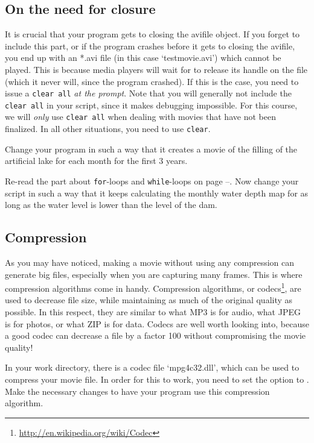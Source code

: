 \subsection{On the need for closure}
It is crucial that your program gets to closing the avifile object. If you forget to include this part, or if the program crashes before it gets to closing the avifile, you end up with an *.avi file (in this case `testmovie.avi') which cannot be played. This is because media players will wait for \MATLAB{} to release its handle on the file (which it never will, since the program crashed). If this is the case, you need to issue a {\tt clear all} \textit{at the prompt}. Note that you will generally not include the {\tt clear all} in your script, since it makes debugging impossible. For this course, we will \textit{only} use {\tt clear all} when dealing with movies that have not been finalized. In all other situations, you need to use {\tt clear}.
\begin{action}
Change your program in such a way that it creates a movie of the filling of the artificial lake for each month for the first 3 years. 
\end{action}

\begin{action}
Re-read the part about {\tt for}-loops and {\tt while}-loops on page \pageref{sec:for-loops}--\pageref{sec:while-loops}. Now change your script in such a way that it keeps calculating the monthly water depth map for as long as the water level is lower than the level of the dam.
\end{action}


\subsection{Compression}
\label{ch:compression}
As you may have noticed, making a movie without using any compression can generate big files, especially when you are capturing many frames. This is where compression algorithms come in handy. Compression algorithms, or codecs\footnote{\url{http://en.wikipedia.org/wiki/Codec}}, are used to decrease file size, while maintaining as much of the original quality as possible. In this respect, they are similar to what MP3 is for audio, what JPEG is for photos, or what ZIP is for data. Codecs are well worth looking into, because a good codec can decrease a file by a factor 100 without compromising the movie quality!

\begin{action}
In your work directory, there is a codec file `mpg4c32.dll', which can be used to compress your movie file. In order for this to work, you need to set the {\tt {}} option to {\tt {}}. Make the necessary changes to have your program use this compression algorithm. 
\end{action}



